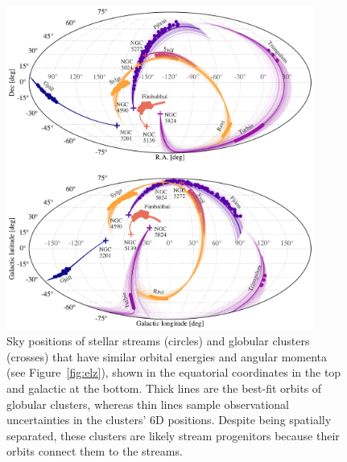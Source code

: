 \documentclass[twocolumn]{aastex63}
\begin{document}

\begin{figure}
\begin{center}
\includegraphics[width=0.9\textwidth]{sky_orbits.pdf}
\end{center}
\caption{
Sky positions of stellar streams (circles) and globular clusters (crosses) that have similar orbital energies and angular momenta (see Figure~\ref{fig:elz}), shown in the equatorial coordinates in the top and galactic at the bottom.
Thick lines are the best-fit orbits of globular clusters, whereas thin lines sample observational uncertainties in the clusters' 6D positions.
Despite being spatially separated, these clusters are likely stream progenitors because their orbits connect them to the streams.
}
\label{fig:sky}
\end{figure}
\end{document}
